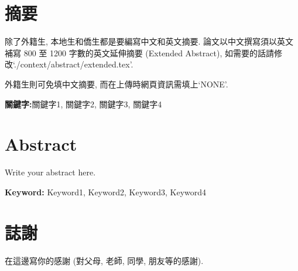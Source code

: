 \setcounter{page}{1}
\newpage
{}
\chapter*{摘要}
\pagestyle{plain}

\begin{spacing}{2.0}

除了外籍生, 本地生和僑生都是要編寫中文和英文摘要. 論文以中文撰寫須以英文補寫 800 至 1200 字數的英文延伸摘要 (Extended Abstract), 如需要的話請修改`./context/abstract/extended.tex'.

外籍生則可免填中文摘要, 而在上傳時網頁資訊需填上`NONE'.

\end{spacing}

\par{\noindent \bf 關鍵字:}{關鍵字1, 關鍵字2, 關鍵字3, 關鍵字4}
\clearpage
{}

\newpage
{}
\chapter*{Abstract}
\pagestyle{plain}

\begin{spacing}{2.0}

Write your abstract here.

\end{spacing}

\par{\noindent \bf Keyword:}{ Keyword1, Keyword2, Keyword3, Keyword4}
\clearpage
{}


\newpage
{}
\chapter*{誌謝}
\pagestyle{plain}

\begin{spacing}{2.0}

在這邊寫你的感謝 (對父母, 老師, 同學, 朋友等的感謝).

\end{spacing}

\clearpage
{}



